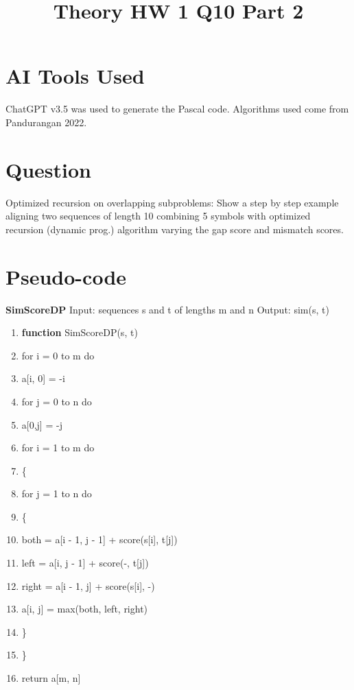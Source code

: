\documentclass[conference]{IEEEtran}
\begin{document}
\section{AI Tools Used}
ChatGPT v3.5 was used to generate the Pascal code. Algorithms used come from Pandurangan 2022.

\title{Theory HW 1 Q10 Part 2}

\author{
}

\maketitle

\section{Question}
%
Optimized recursion on overlapping subproblems:
Show a step by step example aligning two sequences of length 10 combining 5 symbols with
optimized recursion (dynamic prog.) algorithm varying the gap score and mismatch scores.




\section{Pseudo-code}

\textbf{SimScoreDP}
\newline
Input: sequences s and t of lengths m and n
\newline
Output: sim(s, t)

\begingroup
\renewcommand\labelenumi{\theenumi:}
\begin{enumerate}
\item \textbf{function} SimScoreDP(s, t)  \label{item:1}
\item for i = 0 to m do \label{item:2}
\item a[i, 0] = -i  \label{item:3}
\item for j = 0 to n do \label{item:4}
\item a[0,j] = -j \label{item:4}
\item for i = 1 to m do \label{item:4}
\item \{ \label{item:4}
\item for j = 1 to n do \label{item:4}
\item \{ \label{item:4}
\item both = a[i - 1, j - 1] + score(s[i], t[j]) \label{item:4}
\item left = a[i, j - 1] + score(-, t[j]) \label{item:4}
\item right = a[i - 1, j] + score(s[i], -) \label{item:4}
\item a[i, j] = max(both, left, right) \label{item:4}
\item \} \label{item:4}
\item \} \label{item:4}
\item return a[m, n] \label{item:4}
\end{enumerate}
\endgroup
\end{document}
